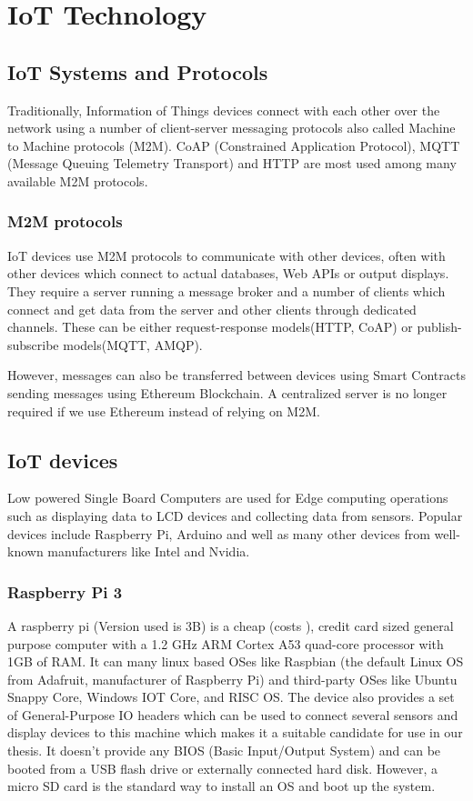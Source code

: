 \documentclass[11pt,openright]{report}
\begin{document}
\chapter{IoT Technology}
\label{chapter:iot_tech}
\section{IoT Systems and Protocols}
Traditionally, Information of Things devices connect with each other over the network using a number of client-server messaging protocols also called Machine to Machine protocols (M2M). CoAP (Constrained Application Protocol), MQTT (Message Queuing Telemetry Transport) and HTTP are most used among many available M2M protocols.

\subsection{M2M protocols}
IoT devices use M2M protocols to communicate with other devices, often with other devices which connect to actual databases, Web APIs or output displays. They require a server running a message broker and a number of clients which connect and get data from the server and other clients through dedicated channels. These can be either request-response models(HTTP, CoAP) or publish-subscribe models(MQTT, AMQP).

However, messages can also be transferred between devices using Smart Contracts sending messages using Ethereum Blockchain. A centralized server is no longer required if we use Ethereum instead of relying on M2M.

\section{IoT devices}
Low powered Single Board Computers are used for Edge computing operations such as displaying data to LCD devices and collecting data from sensors. Popular devices include Raspberry Pi, Arduino and well as many other devices from well-known manufacturers like Intel and Nvidia.

\subsection{Raspberry Pi 3}
A raspberry pi (Version used is 3B) is a cheap (costs ), credit card sized general purpose computer with a 1.2 GHz ARM Cortex A53 quad-core processor with 1GB of RAM. It can many linux based OSes like Raspbian (the default Linux OS from Adafruit, manufacturer of Raspberry Pi) and third-party OSes like Ubuntu Snappy Core, Windows IOT Core, and RISC OS. The device also provides a set of General-Purpose IO headers which can be used to connect several sensors and display devices to this machine which makes it a suitable candidate for use in our thesis. It doesn't provide any BIOS (Basic Input/Output System) and can be booted from a USB flash drive or externally connected hard disk. However, a micro SD card is the standard way to install an OS and boot up the system.  
\end{document}
